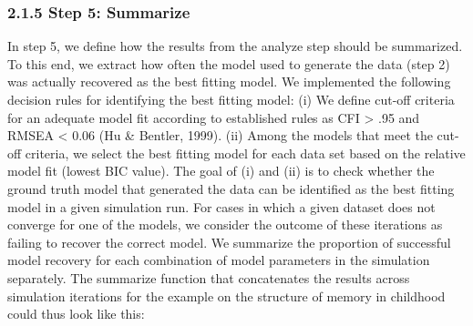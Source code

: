 \documentclass[
  man,floatsintext]{apa6}
\begin{document}
\hypertarget{step-5-summarize}{%
\subsubsection{2.1.5 Step 5: Summarize}\label{step-5-summarize}}

In step 5, we define how the results from the analyze step should be summarized. To this end, we extract how often the model used to generate the data (step 2) was actually recovered as the best fitting model. We implemented the following decision rules for identifying the best fitting model: (i) We define cut-off criteria for an adequate model fit according to established rules as CFI \textgreater{} .95 and RMSEA \textless{} 0.06 (Hu \& Bentler, 1999). (ii) Among the models that meet the cut-off criteria, we select the best fitting model for each data set based on the relative model fit (lowest BIC value). The goal of (i) and (ii) is to check whether the ground truth model that generated the data can be identified as the best fitting model in a given simulation run. For cases in which a given dataset does not converge for one of the models, we consider the outcome of these iterations as failing to recover the correct model. We summarize the proportion of successful model recovery for each combination of model parameters in the simulation separately. The summarize function that concatenates the results across simulation iterations for the example on the structure of memory in childhood could thus look like this:
\end{document}
